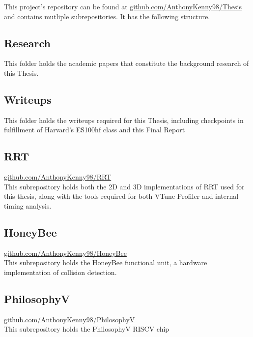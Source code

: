 
This project's repository can be found at \href{github.com/AnthonyKenny98/Thesis}{github.com/AnthonyKenny98/Thesis} and contains mutliple subrepositories. It has the following structure.

\subsection*{Research}
    This folder holds the academic papers that constitute the background research of this Thesis.

\subsection*{Writeups}
    This folder holds the writeups required for this Thesis, including checkpoints in fulfillment of Harvard's ES100hf class and this Final Report

\subsection*{RRT}
 \href{github.com/AnthonyKenny98/RRT}{github.com/AnthonyKenny98/RRT} \\
    This subrepository holds both the 2D and 3D implementations of RRT used for this thesis, along with the tools required for both VTune Profiler and internal timing analysis.

\subsection*{HoneyBee}
    \href{github.com/AnthonyKenny98/HoneyBee}{github.com/AnthonyKenny98/HoneyBee} \\
    This subrepository holds the HoneyBee functional unit, a hardware implementation of collision detection.

\subsection*{PhilosophyV}
    \href{github.com/AnthonyKenny98/PhilosophyV}{github.com/AnthonyKenny98/PhilosophyV} \\
    This subrepository holds the PhilosophyV RISCV chip
